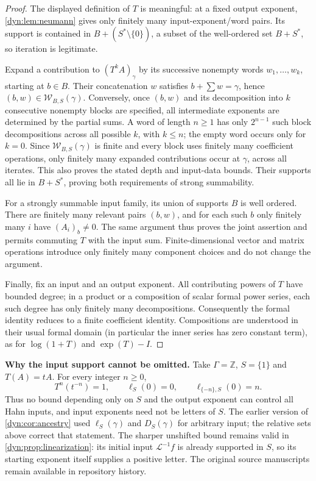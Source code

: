 \documentclass[11pt,letterpaper]{article}
\theoremstyle{definition}
\theoremstyle{remark}
\newcommand{\Z}{\mathbb Z}
\newcommand{\word}{\mathcal W}
\newcommand{\Li}{\mathcal L}
\numberwithin{equation}{section}
\begin{document}
\begin{proof}
The displayed definition of $T$ is meaningful: at a fixed output exponent,
\cref{dyn:lem:neumann} gives only finitely many input-exponent/word pairs.
Its support is contained in $B+(S^{*}\setminus\{0\})$, a subset of the
well-ordered set $B+S^{*}$, so iteration is legitimate.

Expand a contribution to $(T^kA)_\gamma$ by its successive nonempty
words $w_1,\ldots,w_k$, starting at $b\in B$. Their concatenation $w$
satisfies $b+\sum w=\gamma$, hence $(b,w)\in\word_{B,S}(\gamma)$.
Conversely, once $(b,w)$ and its decomposition into $k$ consecutive
nonempty blocks are specified, all intermediate exponents are determined
by the partial sums. A word of length $n\ge1$ has only $2^{n-1}$ such
block decompositions across all possible $k$, with $k\le n$; the empty
word occurs only for $k=0$. Since $\word_{B,S}(\gamma)$ is finite and
every block uses finitely many coefficient operations, only finitely many
expanded contributions occur at $\gamma$, across all iterates. This also
proves the stated depth and input-data bounds. Their supports all lie in
$B+S^{*}$, proving both requirements of strong summability.

For a strongly summable input family, its union of supports $B$ is well
ordered. There are finitely many relevant pairs $(b,w)$, and for each such
$b$ only finitely many $i$ have $(A_i)_b\ne0$. The same argument thus
proves the joint assertion and permits commuting $T$ with the input sum.
Finite-dimensional vector and matrix operations introduce only finitely
many component choices and do not change the argument.

Finally, fix an input and an output exponent. All contributing powers of
$T$ have bounded degree; in a product or a composition of scalar formal
power series, each such degree has only finitely many decompositions.
Consequently the formal identity reduces to a finite coefficient
identity. Compositions are understood in their usual formal domain (in
particular the inner series has zero constant term), as for
$\log(1+T)$ and $\exp(T)-I$.
\end{proof}

\noindent\textbf{Why the input support cannot be omitted.}
Take $\Gamma=\Z$, $S=\{1\}$ and $T(A)=tA$. For every integer $n\ge0$,
\[
 T^n(t^{-n})=1,\qquad
 \ell_S(0)=0,\qquad \ell_{\{-n\},S}(0)=n.
\]
Thus no bound depending only on $S$ and the output exponent can control
all Hahn inputs, and input exponents need not be letters of $S$.
The earlier version of \cref{dyn:cor:ancestry} used $\ell_S(\gamma)$ and
$D_S(\gamma)$ for arbitrary input; the relative sets above correct that
statement. The sharper unshifted bound remains valid in
\cref{dyn:prop:linearization}: its initial input $\Li^{-1}f$ is already
supported in $S$, so its starting exponent itself supplies a positive
letter. The original source manuscripts remain available in repository history.
\end{document}
